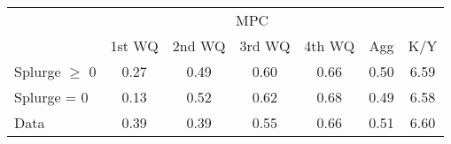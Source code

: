\begin{tabular}{@{}lcccccc@{}} 
\toprule 
                  & \multicolumn{5}{c}{MPC} &   \\   
                  &  1st WQ  & 2nd WQ  & 3rd WQ & 4th WQ  & Agg  &  K/Y  \\  \midrule 
Splurge $\geq$ 0 &0.27 & 0.49 & 0.60 & 0.66 & 0.50 & 6.59 \\ 
Splurge = 0 &0.13 & 0.52 & 0.62 & 0.68 & 0.49 & 6.58 \\ 
Data &0.39 & 0.39 & 0.55 & 0.66 & 0.51 & 6.60 \\ 
\end{tabular}  

